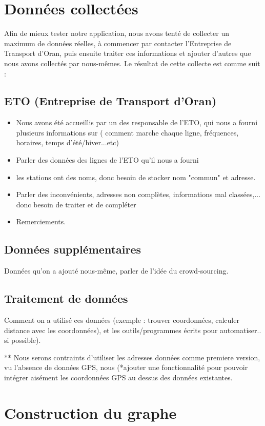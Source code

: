 \section{Données collectées}
Afin de mieux tester notre application, nous avons tenté de collecter un maximum de données réelles, à commencer par contacter l'Entreprise de Transport d'Oran, puis ensuite traiter ces informations et ajouter d'autres que nous avons collectés par nous-mêmes.
Le résultat de cette collecte est comme suit :

\subsection{ETO (Entreprise de Transport d'Oran)}
\begin{itemize}
	\item Nous avons été accueillis par un des responsable de l'ETO, qui nous a fourni plusieurs informations sur ( comment marche chaque ligne, fréquences, horaires, temps d'été/hiver...etc)
	\item Parler des données des lignes de l'ETO qu'il nous a fourni
	\item les stations ont des noms, donc besoin de stocker nom "commun" et adresse.
	\item Parler des inconvénients, adresses non complètes, informations mal classées,... donc besoin de traiter et de compléter
	\item Remerciements. %
\end{itemize}

\subsection{Données supplémentaires}
Données qu'on a ajouté nous-même, parler de l'idée du crowd-sourcing.

\subsection{Traitement de données}
Comment on a utilisé ces données (exemple : trouver coordonnées, calculer distance avec les coordonnées), et les outils/programmes écrits pour automatiser.. si possible).
	
** Nous serons contraints d'utiliser les adresses données comme premiere version, vu l'absence de données GPS, nous (*ajouter une fonctionnalité pour pouvoir intégrer aisément les coordonnées GPS au dessus des données existantes.

\section{Construction du graphe}
